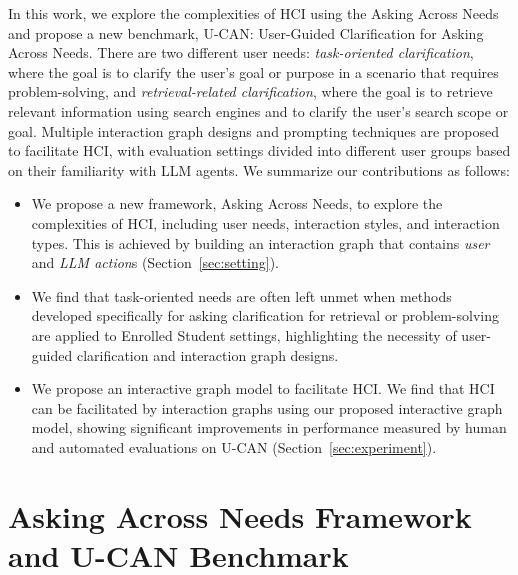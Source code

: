 \documentclass{article} %
\theoremstyle{definition}
\begin{document}
In this work, we explore the complexities of HCI using the Asking Across Needs  and propose a new benchmark, U-CAN: User-Guided Clarification for Asking Across Needs.
There are two different user needs: \textit{task-oriented clarification}, where the goal is to clarify the user's goal or purpose in a scenario that requires problem-solving, and \textit{retrieval-related clarification}, where the goal is to retrieve relevant information using search engines and to clarify the user's search scope or goal.
Multiple interaction graph designs and prompting techniques are proposed to facilitate HCI, with evaluation settings divided into different user groups based on their familiarity with LLM agents.
We summarize our contributions as follows:
\begin{itemize}[leftmargin=*,topsep=-0.8\parskip,noitemsep,nolistsep]
    \item We propose a new framework, Asking Across Needs, to explore the complexities of HCI, including user needs, interaction styles, and interaction types. This is achieved by building an interaction graph that contains \textit{user} and \textit{LLM action}s (Section~\ref{sec:setting}).
    \item We find that task-oriented needs are often left unmet when  methods developed specifically for asking clarification for retrieval or problem-solving are applied to Enrolled Student settings, highlighting the necessity of user-guided clarification and interaction graph designs.
    \item We propose an interactive graph model to facilitate HCI. We find that HCI can be facilitated by interaction graphs using our proposed interactive graph model, showing significant improvements in performance measured by human and automated evaluations on U-CAN (Section~\ref{sec:experiment}).
\end{itemize}%




\section{Asking Across Needs Framework and U-CAN Benchmark}
\end{document}
